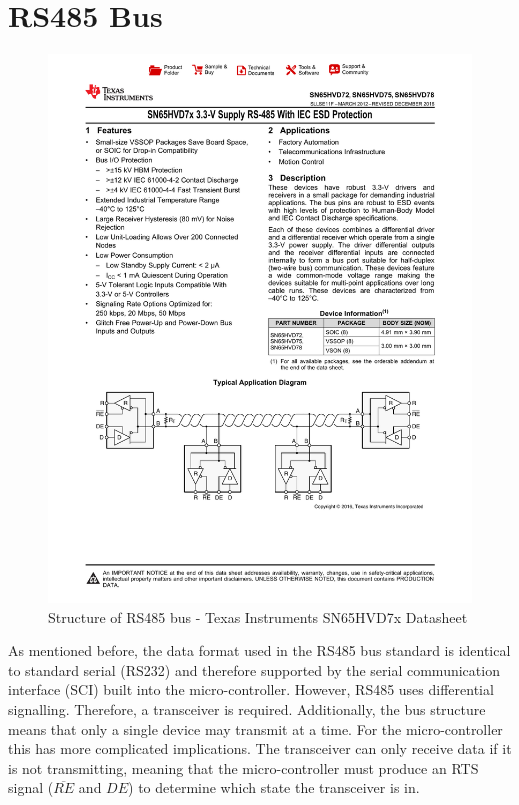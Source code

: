 \section{RS485 Bus}

\begin{figure}[H]
    \centering \includegraphics[width=1.0\textwidth]{./figures/rs485_structure.pdf}
    \caption{Structure of RS485 bus - Texas Instruments SN65HVD7x Datasheet\cite{RS485TransceiverDatasheet}}
    \label{fig:rs485_structure}
\end{figure}

As mentioned before, the data format used in the RS485 bus standard is identical to standard serial (RS232) and therefore supported by the serial communication interface (SCI) built into the micro-controller. However, RS485 uses differential signalling. Therefore, a transceiver is required. Additionally, the bus structure means that only a single device may transmit at a time. For the micro-controller this has more complicated implications. The transceiver can only receive data if it is not transmitting, meaning that the micro-controller must produce an RTS signal ($\overline{RE}$ and $DE$) to determine which state the transceiver is in.

